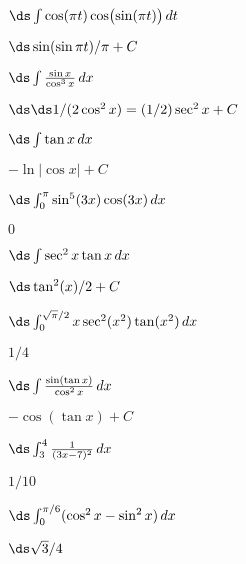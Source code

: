 \begin{enumialphparenastyle}
\begin{ex}
 $\ds\int \cos(\pi t)\cos\bigl(\sin(\pi t)\bigr)\,dt$
\begin{sol}
 $\ds \sin(\sin\pi t)/\pi+C$
\end{sol}
\end{ex}

\begin{ex}
 $\ds\int {\sin x\over\cos^3 x}\,dx$
\begin{sol}
 $\ds \ds 1/(2\cos^2 x)=(1/2)\sec^2x+C$
\end{sol}
\end{ex}

\begin{ex}
 $\ds\int\tan x\,dx$
\begin{sol}
 $-\ln|\cos x|+C$
\end{sol}
\end{ex}

\begin{ex}
  $\ds\int_0^\pi\sin^5(3x)\cos(3x)\,dx$
\begin{sol}
 $0$
\end{sol}
\end{ex}

\begin{ex}
 $\ds\int\sec^2x\tan x\,dx$
\begin{sol}
 $\ds \tan^2(x)/2+C$
\end{sol}
\end{ex}

\begin{ex}
 $\ds\int_0^{\sqrt{\pi}/2} x\sec^2(x^2)\tan(x^2)\,dx$
\begin{sol}
 $1/4$
\end{sol}
\end{ex}

\begin{ex}
 $\ds\int {\sin(\tan x)\over\cos^2x}\,dx$
\begin{sol}
 $-\cos(\tan x)+C$
\end{sol}
\end{ex}

\begin{ex}
 $\ds\int_3^4 {1\over(3x-7)^2}\,dx$
\begin{sol}
 $1/10$
\end{sol}
\end{ex}

\begin{ex}
 $\ds\int_0^{\pi/6}(\cos^2x - \sin^2x)\,dx$
\begin{sol}
 $\ds \sqrt3/4$
\end{sol}
\end{ex}


\end{enumialphparenastyle}
